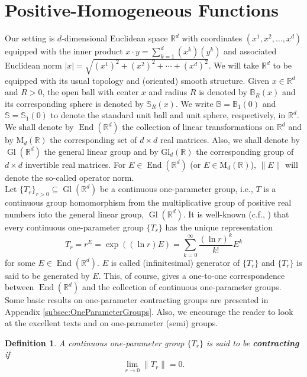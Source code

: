 \documentclass[11pt]{article}
\newtheorem{definition}[theorem]{Definition}
\theoremstyle{remark}
\newcommand\MdR{\mbox{M}_d(\mathbb{R})} %
\newcommand\End{\operatorname{End}} %
\newcommand\GldR{\mbox{Gl}_d(\mathbb{R})}%
\newcommand\Gl{\operatorname{Gl}} %
\begin{document}
\section{Positive-Homogeneous Functions}

Our setting is $d$-dimensional Euclidean space $\mathbb{R}^d$ with coordinates $(x^1,x^2,\dots,x^d)$ equipped with the inner product $x\cdot y=\sum_{k=1}^d(x^k)(y^k)$ and associated Euclidean norm $|x|=\sqrt{(x^1)^2+(x^2)^2+\cdots+(x^d)^2}$. We will take $\mathbb{R}^d$ to be equipped with its usual topology and (oriented) smooth structure. Given $x\in\mathbb{R}^d$ and $R>0$, the open ball with center $x$ and radius $R$ is denoted by $\mathbb{B}_R(x)$ and its corresponding sphere is denoted by $\mathbb{S}_R(x)$. We write $\mathbb{B}=\mathbb{B}_1(0)$ and $\mathbb{S}=\mathbb{S}_1(0)$ to denote the standard unit ball and unit sphere, respectively, in $\mathbb{R}^d$. We shall denote by $\End(\mathbb{R}^d)$ the collection of linear transformations on $\mathbb{R}^d$ and by $\MdR$ the corresponding set of $d\times d$ real matrices. Also, we shall denote by $\Gl(\mathbb{R}^d)$ the general linear group and by $\GldR$ the corresponding group of $d\times d$ invertible real matrices. For $E\in \End(\mathbb{R}^d)$ (or $E\in\MdR$), $\|E\|$ will denote the so-called operator norm.\\

\noindent Let $\{T_r\}_{r>0}\subseteq \Gl(\mathbb{R}^d)$ be a continuous one-parameter group, i.e., $T$ is a continuous group homomorphism from the multiplicative group of positive real numbers into the general linear group, $\Gl(\mathbb{R}^d)$. It is well-known (c.f., \cite{Randles2017,Engel2000,Engel2005}) that every continuous one-parameter group $\{T_r\}$ has the unique representation
\begin{equation*}
T_r=r^E=\exp((\ln r) E)=\sum_{k=0}^\infty \frac{(\ln r)^k}{k!}E^k
\end{equation*}
for some $E\in\End(\mathbb{R}^d)$. $E$ is called (infinitesimal) generator of $\{T_r\}$ and $\{T_r\}$ is said to be generated by $E$. This, of course, gives a one-to-one correspondence between $\End(\mathbb{R}^d)$ and the collection of continuous one-parameter groups. Some basic results on one-parameter contracting groups are presented in Appendix \ref{subsec:OneParameterGroups}. Also, we encourage the reader to look at the excellent texts \cite{Engel2005} and \cite{Engel2000} on one-parameter (semi) groups.

\begin{definition} A continuous one-parameter group $\{T_r\}$ is said to be \textbf{contracting} if
\begin{equation*}
\lim_{r\to 0}\|T_r\|=0. 
\end{equation*}
\end{definition}
\end{document}
